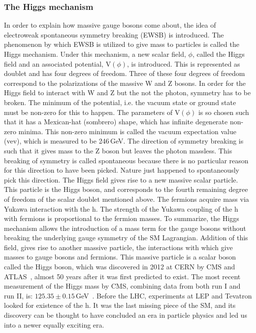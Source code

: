 \subsubsection{The Higgs mechanism}
In order to explain how massive gauge bosons come about, the idea of electroweak spontaneous symmetry breaking (EWSB) is introduced. The phenomenon by which EWSB is utilized to give mass to particles is called the Higgs mechanism. Under this mechanism, a new scalar field, $\phi$, called the Higgs field and an associated potential, V$(\phi)$, is introduced. This is represented as doublet and has four degrees of freedom. Three of these four degrees of freedom correspond to the polarizations of the massive W and Z bosons. In order for the Higgs field to interact with W and Z but the not the photon, symmetry has to be broken. The minimum of the potential, i.e. the vacuum state or ground state must be non-zero for this to happen. The parameters of V$(\phi)$ is so chosen such that it has a Mexican-hat (sombrero) shape, which has infinite degenerate non-zero minima. This non-zero minimum is called the vacuum expectation value (vev), which is measured to be 246\,GeV. The direction of symmetry breaking is such that it gives mass to the Z boson but leaves the photon massless. This breaking of symmetry is called spontaneous because there is no particular reason for this direction to have been picked. Nature just happened to spontaneously pick this direction. The Higgs field gives rise to a new massive scalar particle. This particle is the Higgs boson, and corresponds to the fourth remaining degree of freedom of the scalar doublet mentioned above. The fermions acquire mass via Yukawa interaction with the h. The strength of the Yukawa coupling of the h with fermions is proportional to the fermion masses. To summarize, the Higgs mechanism allows the introduction of a mass term for the gauge bosons without breaking the underlying gauge symmetry of the SM Lagrangian. Addition of this field, gives rise to another massive particle, the interactions with which give masses to gauge bosons and fermions. This massive particle is a scalar boson called the Higgs boson, which was discovered in 2012 at CERN by CMS and ATLAS~\cite{Aad:2012tfa, Chatrchyan:2012ufa, Chatrchyan:2013lba}, almost 50 years after it was first predicted to exist. The most recent measurement of the Higgs mass by CMS, combining data from both run I and run II, is: $125.35\pm0.15$\,GeV~\cite{HIG-19-004}. Before the LHC, experiments at LEP and Tevatron looked for existence of the h. It was the last missing piece of the SM, and its discovery can be thought to have concluded an era in particle physics and led us into a newer equally exciting era.


